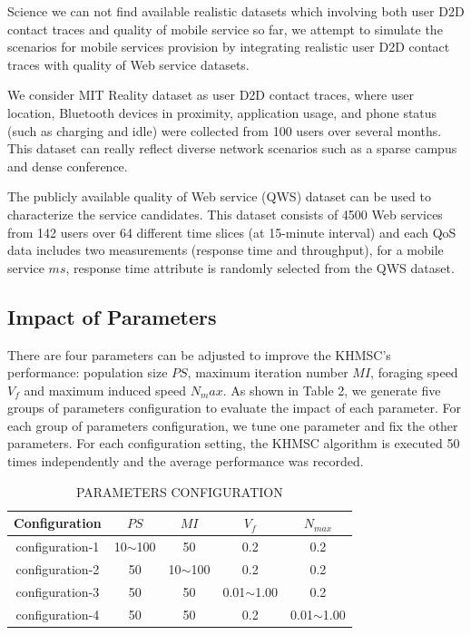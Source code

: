 \documentclass[10pt,journal,compsoc]{IEEEtran}
\begin{document}
Science we can not find available realistic datasets which involving both user D2D contact traces and quality of mobile service so far, we attempt to simulate the scenarios for mobile services provision by integrating realistic user D2D contact traces with quality of Web service datasets. 

We consider MIT Reality dataset as user D2D contact traces, where user location, Bluetooth devices in proximity, application usage, and phone status (such as charging and idle) were collected from 100 users over several months. This dataset can really reflect diverse network scenarios such as a sparse campus and dense conference.

The publicly available quality of Web service (QWS) dataset\cite{zheng2014investigating} can be used to characterize the service candidates. This dataset consists of 4500 Web services from 142 users over 64 different time slices (at 15-minute interval) and each QoS data includes two measurements (response time and throughput), for a mobile service $ms$, response time attribute is randomly selected from the QWS dataset. 

\subsection{Impact of Parameters}
There are four parameters can be adjusted to improve the KHMSC's performance: population size $PS$, maximum iteration number $MI$, foraging speed $V_f$ and maximum induced speed $N_max$. As shown in Table 2, we generate five groups of parameters configuration to evaluate the impact of each parameter. For each group of parameters configuration, we tune one parameter and fix the other parameters. For each configuration setting, the KHMSC algorithm is executed 50 times independently and the average performance was recorded.

\begin{table}[!t]
\renewcommand{\arraystretch}{1.3}
\caption{PARAMETERS CONFIGURATION}
\label{table_example}
\centering
\begin{tabular}{ccccc}
\hline
\bfseries Configuration & \bfseries $PS$ & \bfseries $MI$ & \bfseries $V_f$ & \bfseries $N_{max}$  \\
\hline
configuration-1 & 10$\sim$100 & 50          & 0.2            & 0.2            \\
configuration-2 & 50          & 10$\sim$100 & 0.2            & 0.2            \\
configuration-3 & 50          & 50          & 0.01$\sim$1.00 & 0.2            \\
configuration-4 & 50          & 50          & 0.2            & 0.01$\sim$1.00 \\
\hline
\end{tabular}
\end{table}
\end{document}
